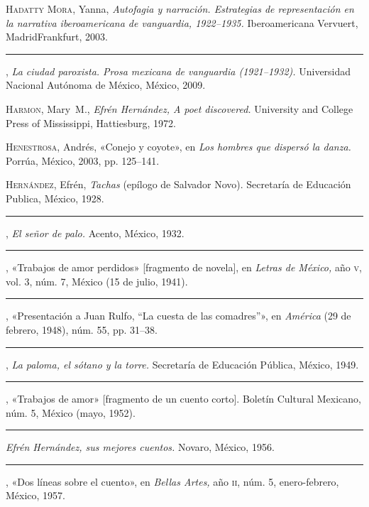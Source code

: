 \documentclass[14pt,twoside,final]{extbook} %
\begin{document}
\textsc{Hadatty Mora}, Yanna, \emph{Autofagia y narración. Estrategias de representación en la narrativa iberoamericana de vanguardia, 1922--1935.} Iberoamericana Vervuert, Madrid Frankfurt, 2003.\label{bib:hadatty2003}

\rule{1cm}{0.4pt}, \emph{La ciudad paroxista. Prosa mexicana de vanguardia (1921--1932).} Universidad Nacional Autónoma de México, México, 2009.\label{bib:hadatty2009}

\textsc{Harmon}, Mary~M., \emph{Efrén Hernández, A poet discovered.} University and College Press of Mississippi, Hattiesburg, 1972.\label{bib:harmon1972}

\textsc{Henestrosa}, Andrés, «Conejo y coyote», en \emph{Los hombres que dispersó la danza.} Porrúa, México, 2003, pp. 125--141.\label{bib:henestroza2003}

\textsc{Hernández}, Efrén, \emph{Tachas} (epílogo de Salvador Novo). Secretaría de Educación Publica, México, 1928.\label{bib:hernandez1928}

\rule{1cm}{0.4pt}, \emph{El señor de palo.} Acento, México, 1932.\label{bib:hernandez1932}

\rule{1cm}{0.4pt}, «Trabajos de amor perdidos» [fragmento de novela], en \emph{Letras de México,} año \textsc{v}, vol. 3, núm. 7, México (15 de julio, 1941).\label{bib:hernandez1941}

\rule{1cm}{0.4pt}, «Presentación a Juan Rulfo, ``La cuesta de las comadres''», en \emph{América} (29 de febrero, 1948), núm. 55, pp. 31--38.\label{bib:hernandez1948}

\rule{1cm}{0.4pt}, \emph{La paloma, el sótano y la torre.} Secretaría de Educación Pública, México, 1949.\label{bib:hernandez1949}

\rule{1cm}{0.4pt}, «Trabajos de amor» [fragmento de un cuento corto]. Boletín Cultural Mexicano, núm. 5, México (mayo, 1952).\label{bib:hernandez1952}

\rule{1cm}{0.4pt} \emph{Efrén Hernández, sus mejores cuentos.} Novaro, México, 1956.\label{bib:hernandez1956}

\rule{1cm}{0.4pt}, «Dos líneas sobre el cuento», en \emph{Bellas Artes,} año \textsc{ii}, núm. 5, enero-febrero, México, 1957.\label{bib:hernandez1957}
\end{document}
